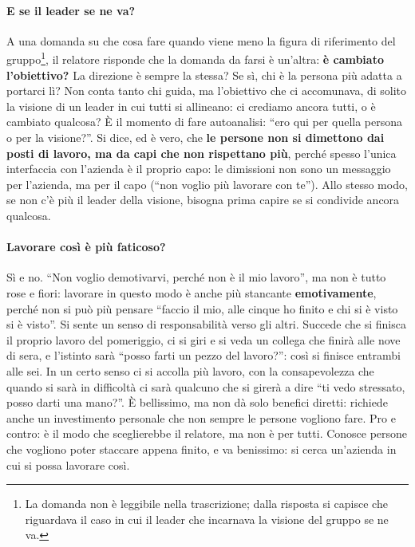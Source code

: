 \paragraph{E se il leader se ne va?} A una domanda su che cosa fare quando viene meno la figura di
riferimento del gruppo\footnote{La domanda non è leggibile nella trascrizione; dalla risposta si
capisce che riguardava il caso in cui il leader che incarnava la visione del gruppo se ne va.}, il
relatore risponde che la domanda da farsi è un'altra: \textbf{è cambiato l'obiettivo?} La direzione è
sempre la stessa? Se sì, chi è la persona più adatta a portarci lì? Non conta tanto chi guida, ma
l'obiettivo che ci accomunava, di solito la visione di un leader in cui tutti si allineano: ci
crediamo ancora tutti, o è cambiato qualcosa? È il momento di fare autoanalisi: ``ero qui per quella
persona o per la visione?''. Si dice, ed è vero, che \textbf{le persone non si dimettono dai posti di
lavoro, ma da capi che non rispettano più}, perché spesso l'unica interfaccia con l'azienda è il
proprio capo: le dimissioni non sono un messaggio per l'azienda, ma per il capo (``non voglio più
lavorare con te''). Allo stesso modo, se non c'è più il leader della visione, bisogna prima capire se
si condivide ancora qualcosa.

\paragraph{Lavorare così è più faticoso?} Sì e no. ``Non voglio demotivarvi, perché non è il mio
lavoro'', ma non è tutto rose e fiori: lavorare in questo modo è anche più stancante
\textbf{emotivamente}, perché non si può più pensare ``faccio il mio, alle cinque ho finito e chi si è
visto si è visto''. Si sente un senso di responsabilità verso gli altri. Succede che si finisca il
proprio lavoro del pomeriggio, ci si giri e si veda un collega che finirà alle nove di sera, e
l'istinto sarà ``posso farti un pezzo del lavoro?'': così si finisce entrambi alle sei. In un certo
senso ci si accolla più lavoro, con la consapevolezza che quando si sarà in difficoltà ci sarà qualcuno
che si girerà a dire ``ti vedo stressato, posso darti una mano?''. È bellissimo, ma non dà solo benefici
diretti: richiede anche un investimento personale che non sempre le persone vogliono fare. Pro e
contro: è il modo che sceglierebbe il relatore, ma non è per tutti. Conosce persone che vogliono poter
staccare appena finito, e va benissimo: si cerca un'azienda in cui si possa lavorare così.

